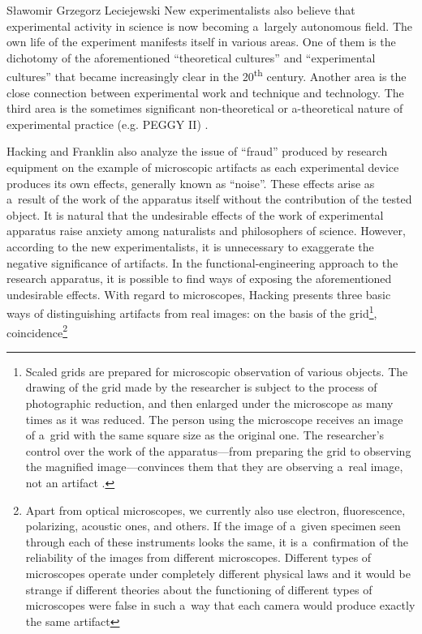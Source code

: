 \begin{artengenv}{Sławomir Grzegorz Leciejewski}
New experimentalists also believe that experimental activity in science is now becoming a~largely autonomous field. The own life of the experiment manifests itself in various areas. One of them is the dichotomy of the aforementioned ``theoretical cultures'' and ``experimental cultures'' that became increasingly clear in the 20\textsuperscript{th} century. Another area is the close connection between experimental work and technique and technology. The third area is the sometimes significant non-theoretical or a-theoretical nature of experimental practice (e.g. PEGGY II) 
\parencite[][pp.161–170]{leplin_experimentation_1984}.%



Hacking 
\parencite*[][]{churchland_we_1985} %
 and Franklin 
\parencite*[][pp.226–243]{franklin_neglect_1986} %
 also analyze the issue of ``fraud'' produced by research equipment on the example of microscopic artifacts as each experimental device produces its own effects, generally known as ``noise''. These effects arise as a~result of the work of the apparatus itself without the contribution of the tested object. It is natural that the undesirable effects of the work of experimental apparatus raise anxiety among naturalists and philosophers of science. However, according to the new experimentalists, it is unnecessary to exaggerate the negative significance of artifacts. In the functional-engineering approach to the research apparatus, it is possible to find ways of exposing the aforementioned undesirable effects. With regard to microscopes, Hacking presents three basic ways of distinguishing artifacts from real images: on the basis of the grid\footnote{Scaled grids are prepared for microscopic observation of various objects. The drawing of the grid made by the researcher is subject to the process of photographic reduction, and then enlarged under the microscope as many times as it was reduced. The person using the microscope receives an image of a~grid with the same square size as the original one. The researcher's control over the work of the apparatus\textrm{---}from preparing the grid to observing the magnified image---convinces them that they are observing a~real image, not an artifact 
\parencite[][]{churchland_we_1985}. %
 }, coincidence\footnote{Apart from optical microscopes, we currently also use electron, fluorescence, polarizing, acoustic ones, and others. If the image of a~given specimen seen through each of these instruments looks the same, it is a~confirmation of the reliability of the images from different microscopes. Different types of microscopes operate under completely different physical laws and it would be strange if different theories about the functioning of different types of microscopes were false in such a~way that each camera would produce exactly the same artifact 
}
\end{artengenv}
